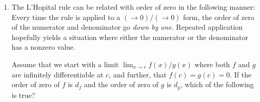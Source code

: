 \documentclass[10pt]{amsart}
\begin{document}
\begin{enumerate}
  \begin{enumerate}[(A)]
  \item $1$
  \item $2$
  \item $3$
  \item $5$
  \item $6$
  \end{enumerate}

  {\em Answer}: Option (E)

  {\em Explanation}: Roughly speaking, the order of zero of the
  composite function is the product of the orders of zeros. This is
  valid when $c = 0$, i.e., we are taking the order of zero at
  zero. Otherwise, the statement needs to be modified somewhat.

  {\em Performance review}: $9$ out of $11$ got this. $1$ each chose
  (C) and (D).
\item The L'Hopital rule can be related with order of zero in the
  following manner: Every time the rule is applied to a $(\to 0)/(\to
  0)$ form, the order of zero of the numerator and denominator go {\em
    down by one}. Repeated application hopefully yields a situation
  where either the numerator or the denominator has a nonzero value.

  Assume that we start with a limit $\lim_{x \to c} f(x)/g(x)$ where
  both $f$ and $g$ are infinitely differentiable at $c$, and further,
  that $f(c) = g(c) = 0$. If the order of zero of $f$ is $d_f$ and the
  order of zero of $g$ is $d_g$, which of the
  following is true?


\end{enumerate}
\end{document}
